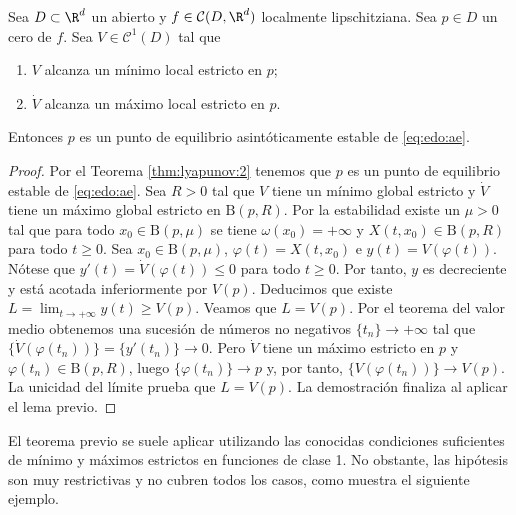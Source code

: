 \begin{theorem}
  \label{thm:lyapunov:3}
  Sea $D \subset \R^d$ un abierto y $f \in \mathcal{C}(D, \R^d)$ localmente lipschitziana. Sea
  $p \in D$ un cero de $f$.  Sea $V \in \mathcal{C}^1(D)$ tal que
  \begin{enumerate}
  \item $V$ alcanza un mínimo local estricto en $p$;
  \item $\dot{V}$ alcanza un máximo local estricto en $p$.
  \end{enumerate}
  Entonces $p$ es un punto de equilibrio asintóticamente estable de \eqref{eq:edo:ae}.
\end{theorem}
\begin{proof}
  Por el Teorema \ref{thm:lyapunov:2} tenemos que $p$ es un punto de equilibrio estable de
  \eqref{eq:edo:ae}. Sea $R > 0$ tal que $V$ tiene un mínimo global estricto y $\dot{V}$ tiene un
  máximo global estricto en $\mathrm{B}(p, R)$. Por la estabilidad existe un $\mu > 0$ tal que para
  todo $x_0 \in \mathrm{B}(p,\mu)$ se tiene $\omega(x_0) = +\infty$ y
  $X(t, x_0) \in \mathrm{B}(p, R)$ para todo $t \ge 0$. Sea $x_0 \in \mathrm{B}(p,\mu)$,
  $\varphi(t) = X(t, x_0)$ e $y(t) = V(\varphi(t))$. Nótese que $y'(t) = \dot{V}(\varphi(t)) \le 0$
  para todo $t \ge 0$. Por tanto, $y$ es decreciente y está acotada inferiormente por
  $V(p)$. Deducimos que existe $L = \lim_{t \to +\infty} y(t) \ge V(p)$. Veamos que $L = V(p)$. Por
  el teorema del valor medio obtenemos una sucesión de números no negativos $\{t_n\}\to+\infty$ tal
  que $\{\dot{V}(\varphi(t_n))\} = \{y'(t_n)\}\to 0$. Pero $\dot{V}$ tiene un máximo estricto en $p$
  y $\varphi(t_n) \in \mathrm{B}(p, R)$, luego $\{\varphi(t_n)\} \to p$ y, por tanto,
  $\{V(\varphi(t_n))\} \to V(p)$. La unicidad del límite prueba que $L = V(p)$. La demostración
  finaliza al aplicar el lema previo.
\end{proof}

El teorema previo se suele aplicar utilizando las conocidas condiciones suficientes de mínimo y
máximos estrictos en funciones de clase 1. No obstante, las hipótesis son muy restrictivas y no
cubren todos los casos, como muestra el siguiente ejemplo.

